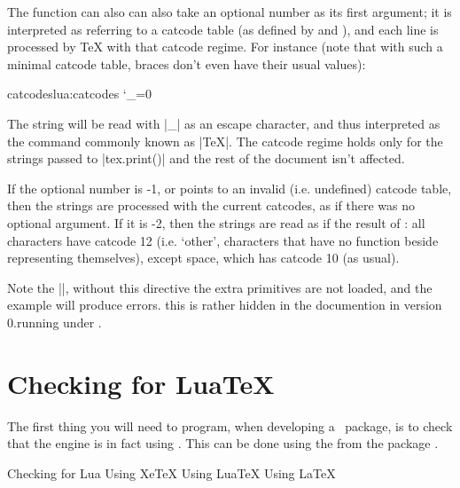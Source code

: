 The function can also can also take an optional number as its first argument; it is interpreted as referring to a catcode table (as defined by  and ), and each line is processed by TeX with that catcode regime. For instance (note that with such a minimal catcode table, braces don't even have their usual values):

\begin{texexample}{catcodes}{lua:catcodes}
\bgroup
{}
\catcode`\_=0
\egroup
{}
\end{texexample}

The string will be read with |_| as an escape character, and thus interpreted as the command commonly known as |\TeX|. The catcode regime holds only for the strings passed to |tex.print()| and the rest of the document isn't affected.

If the optional number is -1, or points to an invalid (i.e. undefined) catcode table, then the strings are processed with the current catcodes, as if there was no optional argument. If it is -2, then the strings are read as if the result of \cmd{\detokenize}: all characters have catcode 12 (i.e. `other', characters that have no function beside representing themselves), except space, which has catcode 10 (as usual).


Note the ||, without this directive the extra primitives are not loaded, and the example will produce errors. this is rather hidden in the documention in version 0.\the\luatexversion running under \formatname.


\section{Checking for LuaTeX}

The first thing you will need to program, when developing a \luatex\ package, is to check that the engine is in fact using \luatex. This can be done using the  from the package . 

\begin{texexample}{Checking for Lua}{}
\ifxetex
  Using XeTeX
\else
  \ifluatex
   Using LuaTeX
  \else
   Using LaTeX
  \fi
\fi
\end{texexample}


